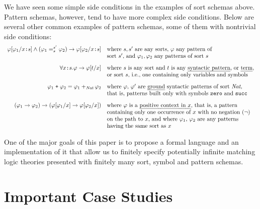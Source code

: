 \documentclass[UTF8,11pt]{article}
\theoremstyle{plain}
\theoremstyle{definition}
\theoremstyle{remark}
\newcommand{\cln}{\texttt{:}}
\newcommand{\Nat}{\textit{Nat}}
\begin{document}
We have seen some simple side conditions in the examples of sort schemas
above.
Pattern schemas, however, tend to have more complex side conditions.
Below are several other common examples of pattern schemas, some of them
with nontrivial side conditions:
$$
\begin{array}{rl}
\varphi[\varphi_1/{x\cln s}] \wedge (\varphi_1 =_s^{s'} \varphi_2) \rightarrow \varphi[\varphi_2/{x\cln s}]
&\textrm{where $s,s'$ are any sorts, $\varphi$ any pattern of} \\
& \textrm{sort $s'$, and $\varphi_1,\varphi_2$ any patterns of sort $s$}
\\[2ex]
\forall x\cln s . \varphi \rightarrow \varphi[t/x]
&\textrm{where $s$ is any sort and $t$ is any \emph{syntactic pattern}, or \emph{term}}, \\
& \textrm{or sort $s$, i.e., one containing only variables and symbols}
\\[2ex]
\varphi_1 \mathrel{\texttt{+}} \varphi_2 = \varphi_1 +_\Nat \varphi_2
& \textrm{where $\varphi$, $\varphi'$ are \emph{ground} syntactic patterns of sort $\Nat$,}
\\
&\textrm{that is, patterns built only with symbols \texttt{zero} and \texttt{succ}}
\\[2ex]
(\varphi_1 \rightarrow \varphi_2) \rightarrow
(\varphi[\varphi_1 / x] \rightarrow \varphi[\varphi_2 / x])
& \textrm{where $\varphi$ is a \emph{positive context in $x$}, that is, a pattern}
\\
& \textrm{containing only one occurrence of $x$ with no negation ($\neg$)}
\\
&\textrm{on the path to $x$, and where $\varphi_1$, $\varphi_2$ are any patterns}
\\
&\textrm{having the same sort as $x$}
\end{array}
$$

One of the major goals of this paper is to propose a formal language
and an implementation of it that allow us to finitely specify potentially
infinite matching logic theories presented with finitely many sort, symbol
and pattern schemas.

\section{Important Case Studies}
\label{sec:case-studies}
\end{document}
